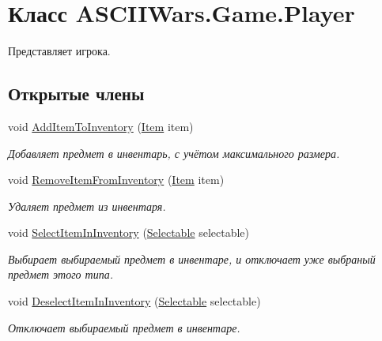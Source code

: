 \hypertarget{class_a_s_c_i_i_wars_1_1_game_1_1_player}{}\section{Класс A\+S\+C\+I\+I\+Wars.\+Game.\+Player}
\label{class_a_s_c_i_i_wars_1_1_game_1_1_player}


Представляет игрока.  


\subsection*{Открытые члены}
\begin{DoxyCompactItemize}
\item 
void \hyperlink{class_a_s_c_i_i_wars_1_1_game_1_1_player_a51054cd802e781a9f0a018f893ec3877}{Add\+Item\+To\+Inventory} (\hyperlink{class_a_s_c_i_i_wars_1_1_game_1_1_item}{Item} item)
\begin{DoxyCompactList}\small\item\em Добавляет предмет в инвентарь, с учётом максимального размера. \end{DoxyCompactList}\item 
void \hyperlink{class_a_s_c_i_i_wars_1_1_game_1_1_player_aa58a605f6337c385f4023ea842f6c246}{Remove\+Item\+From\+Inventory} (\hyperlink{class_a_s_c_i_i_wars_1_1_game_1_1_item}{Item} item)
\begin{DoxyCompactList}\small\item\em Удаляет предмет из инвентаря. \end{DoxyCompactList}\item 
void \hyperlink{class_a_s_c_i_i_wars_1_1_game_1_1_player_aec1c1f808fa3da1585a62487b0e92a38}{Select\+Item\+In\+Inventory} (\hyperlink{class_a_s_c_i_i_wars_1_1_game_1_1_selectable}{Selectable} selectable)
\begin{DoxyCompactList}\small\item\em Выбирает выбираемый предмет в инвентаре, и отключает уже выбраный предмет этого типа. \end{DoxyCompactList}\item 
void \hyperlink{class_a_s_c_i_i_wars_1_1_game_1_1_player_a104ae32d59b6e627d55dc78ff4ffa995}{Deselect\+Item\+In\+Inventory} (\hyperlink{class_a_s_c_i_i_wars_1_1_game_1_1_selectable}{Selectable} selectable)
\begin{DoxyCompactList}\small\item\em Отключает выбираемый предмет в инвентаре. \end{DoxyCompactList}\item 

\end{DoxyCompactItemize}
